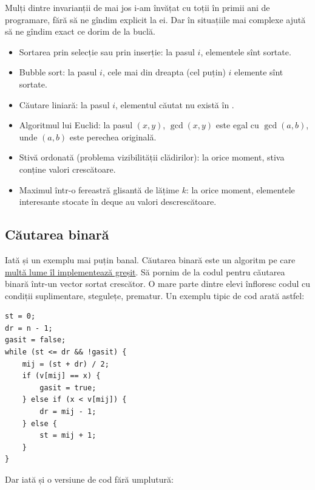 \documentclass[../main.tex]{subfiles}
\begin{document}
Mulți dintre invarianții de mai jos i-am învățat cu toții în primii ani de programare, fără să ne gîndim explicit la ei. Dar în situațiile mai complexe ajută să ne gîndim exact ce dorim de la buclă.

\begin{itemize}
  \item Sortarea prin selecție sau prin inserție: la pasul $i$, elementele  sînt sortate.

  \item Bubble sort: la pasul $i$, cele mai din dreapta (cel puțin) $i$ elemente sînt sortate.

  \item Căutare liniară: la pasul $i$, elementul căutat nu există în .

  \item Algoritmul lui Euclid: la pasul $(x,y)$, $\gcd(x,y)$ este egal cu $\gcd(a,b)$, unde $(a,b)$ este perechea originală.

  \item Stivă ordonată (problema vizibilității clădirilor): la orice moment, stiva conține valori crescătoare.

  \item Maximul într-o fereastră glisantă de lățime $k$: la orice moment, elementele interesante stocate în deque au valori descrescătoare.
\end{itemize}

\subsection{Căutarea binară}

Iată și un exemplu mai puțin banal. Căutarea binară este un algoritm pe care \href{https://en.wikipedia.org/wiki/Binary_search_algorithm#Implementation_issues}{multă lume îl implementează greșit}. Să pornim de la codul pentru căutarea binară într-un vector sortat crescător. O mare parte dintre elevi înfloresc codul cu condiții suplimentare, stegulețe,  prematur. Un exemplu tipic de cod arată astfel:

\begin{verbatim}
st = 0;
dr = n - 1;
gasit = false;
while (st <= dr && !gasit) {
    mij = (st + dr) / 2;
    if (v[mij] == x) {
        gasit = true;
    } else if (x < v[mij]) {
        dr = mij - 1;
    } else {
        st = mij + 1;
    }
}
\end{verbatim}

Dar iată și o versiune de cod fără umplutură:
\end{document}
